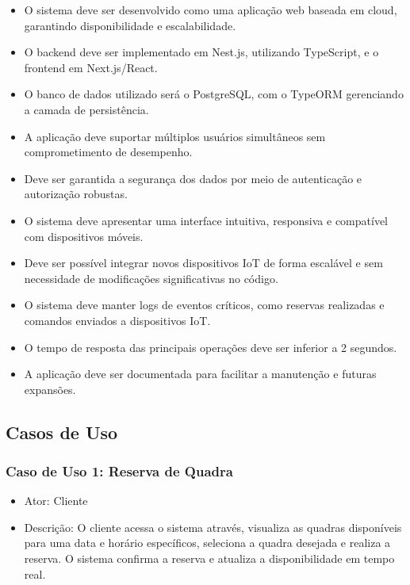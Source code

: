 \begin{itemize}
     \item O sistema deve ser desenvolvido como uma aplicação web baseada em cloud, garantindo disponibilidade e escalabilidade.
     \item O backend deve ser implementado em Nest.js, utilizando TypeScript, e o frontend em Next.js/React.
     \item O banco de dados utilizado será o PostgreSQL, com o TypeORM gerenciando a camada de persistência.
     \item A aplicação deve suportar múltiplos usuários simultâneos sem comprometimento de desempenho.
     \item Deve ser garantida a segurança dos dados por meio de autenticação e autorização robustas.
     \item O sistema deve apresentar uma interface intuitiva, responsiva e compatível com dispositivos móveis.
     \item Deve ser possível integrar novos dispositivos IoT de forma escalável e sem necessidade de modificações significativas no código.
     \item O sistema deve manter logs de eventos críticos, como reservas realizadas e comandos enviados a dispositivos IoT.
     \item O tempo de resposta das principais operações deve ser inferior a 2 segundos.
     \item A aplicação deve ser documentada para facilitar a manutenção e futuras expansões.
\end{itemize}


\subsection{Casos de Uso}\label{subsect:casos_de_uso}

\subsubsection*{Caso de Uso 1: Reserva de Quadra}
\begin{itemize}
     \item Ator: Cliente
     \item Descrição: O cliente acessa o sistema através, visualiza as quadras disponíveis para uma data e horário específicos, seleciona a quadra desejada e realiza a reserva. O sistema confirma a reserva e atualiza a disponibilidade em tempo real.     
\end{itemize}

